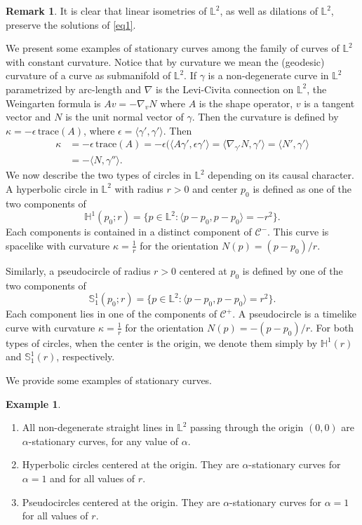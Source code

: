 \documentclass[a4paper,12pt]{amsart}
\theoremstyle{definition}
\newtheorem{example}[theorem]{Example}
\newtheorem{remark}[theorem]{Remark}
\def\h{\mathbb H}
\def\l{\mathbb L}
\def\s{\mathbb S}
\begin{document}
\begin{remark} 
It is clear that linear isometries of $\l^2$, as well as dilations of $\l^2$, preserve the solutions of \eqref{eq1}.
\end{remark}

We present  some examples of stationary curves among the family of curves of $\l^2$ with constant curvature. Notice that by curvature we mean the (geodesic) curvature of a curve as submanifold of $\l^2$. If $\gamma$ is a non-degenerate curve in $\l^2$ parametrized by arc-length and $\nabla$ is the Levi-Civita connection on $\l^2$, the Weingarten formula is  $Av=-\nabla_v N$ where $A$ is the shape operator, $v$ is a tangent vector  and $N$ is the unit normal vector of $\gamma$. Then  the curvature is defined by $\kappa=-\epsilon\, \mbox{trace}(A)$, where   $\epsilon=\langle \gamma',\gamma'\rangle$. Then  
\begin{equation}\label{cu}
\begin{split}
\kappa&=-\epsilon\, \mbox{trace}(A)=-\epsilon(\langle A\gamma',\epsilon\gamma'\rangle= \langle \nabla_{\gamma'}N,\gamma'\rangle=\langle N ',\gamma'\rangle\\
&=-\langle N,\gamma'' \rangle.
\end{split}
\end{equation}
We now describe the two types of circles in $\l^2$ depending on its causal character. A hyperbolic circle in $\l^2$ with radius $r>0$ and center $p_0$ is defined as  one of the two components of
$$
\h^1(p_0;r)=\{ p \in \l^2 : \langle p-p_0, p-p_0 \rangle =-r^2\}.
$$
Each components is contained in a distinct component  of $\mathcal{C}^-$. This curve is spacelike with curvature $\kappa=\frac{1}{r}$ for the orientation $N(p)=(p-p_0)/r$.

Similarly, a pseudocircle of radius $r>0$ centered at $p_0$ is defined by one of the two components of
$$
\s^1_{1}(p_0;r)=\{ p \in \l^2 : \langle p-p_0, p-p_0 \rangle =r^2\}.
$$
Each component lies in one of the components of $\mathcal{C}^+$.  A pseudocircle is a timelike curve with  curvature  $\kappa=\frac{1}{r}$  for the orientation $N(p)=-(p-p_0)/r$. For both types of circles, when the center is the origin, we denote them simply by $\h^1(r)$ and $\s^1_1(r)$, respectively.

We provide some examples of stationary curves. 
\begin{example}  
\begin{enumerate}  
\item  All non-degenerate straight lines in $\l^2$ passing through the origin $(0,0)$ are $\alpha$-stationary curves, for any  value of $\alpha$.
\item    Hyperbolic  circles centered at the origin. They are $\alpha$-stationary curves for $\alpha=1$ and for all values of $r$. 
 
\item  Pseudocircles centered at the origin. They are $\alpha$-stationary curves for $\alpha=1$  for all values of $r$.   \end{enumerate}
 \end{example}
  
\end{document}
